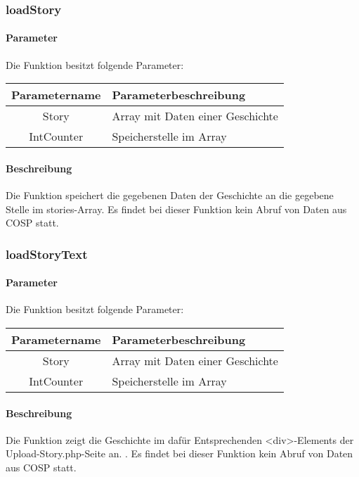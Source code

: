 \subsubsection{loadStory}
\paragraph{Parameter} Die Funktion besitzt folgende Parameter:
\begin{table}[H]
	\begin{tabular}{|c|p{11cm}|}
		\hline
		\textbf{Parametername} & \textbf{Parameterbeschreibung} \\ \hline
		Story      & Array mit Daten einer Geschichte \\ \hline
		IntCounter & Speicherstelle im Array \\ \hline
	\end{tabular}
\end{table}
\paragraph{Beschreibung} Die Funktion speichert die gegebenen Daten der Geschichte an die gegebene Stelle im {\glqq stories\grqq}-Array. Es findet bei dieser Funktion kein Abruf von Daten aus {\glqq COSP\grqq} statt.
\subsubsection{loadStoryText}
\paragraph{Parameter} Die Funktion besitzt folgende Parameter:
\begin{table}[H]
	\begin{tabular}{|c|p{11cm}|}
		\hline
		\textbf{Parametername} & \textbf{Parameterbeschreibung} \\ \hline
		Story      & Array mit Daten einer Geschichte \\ \hline
		IntCounter & Speicherstelle im Array \\ \hline
	\end{tabular}
\end{table}
\paragraph{Beschreibung} Die Funktion zeigt die Geschichte im dafür Entsprechenden <div>-Elements der {\glqq Upload-Story.php\grqq}-Seite an. . Es findet bei dieser Funktion kein Abruf von Daten aus {\glqq COSP\grqq} statt.
